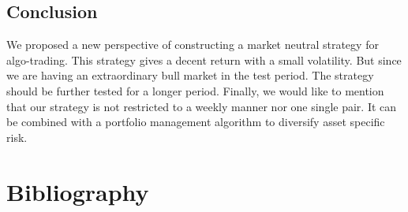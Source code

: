 \documentclass[11pt,a4paper]{article}
\begin{document}
    \subsection{Conclusion}
    We proposed a new perspective of constructing a market neutral strategy for algo-trading. This strategy gives a decent return with a small volatility. But since we are having an extraordinary bull market in the test period. The strategy should be further tested for a longer period. Finally, we would like to mention that our strategy is not restricted to a weekly manner nor one single pair. It can be combined with a portfolio management algorithm to diversify asset specific risk. 
    
    \newpage
    \section{Bibliography}
    
    
\end{document}

